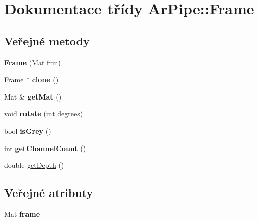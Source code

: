 \hypertarget{class_ar_pipe_1_1_frame}{\section{Dokumentace třídy Ar\-Pipe\-:\-:Frame}
\label{dd/d9d/class_ar_pipe_1_1_frame}
}
\subsection*{Veřejné metody}
\begin{DoxyCompactItemize}
\item 
\hypertarget{class_ar_pipe_1_1_frame_a7df86733519e85d78810c42e3af6d705}{{\bfseries Frame} (Mat frm)}\label{dd/d9d/class_ar_pipe_1_1_frame_a7df86733519e85d78810c42e3af6d705}

\item 
\hypertarget{class_ar_pipe_1_1_frame_afa0519f1ec506df02dfdce31bc5f60b0}{\hyperlink{class_ar_pipe_1_1_frame}{Frame} $\ast$ {\bfseries clone} ()}\label{dd/d9d/class_ar_pipe_1_1_frame_afa0519f1ec506df02dfdce31bc5f60b0}

\item 
\hypertarget{class_ar_pipe_1_1_frame_a288d704c6ca113753dc2f475ebba7060}{Mat \& {\bfseries get\-Mat} ()}\label{dd/d9d/class_ar_pipe_1_1_frame_a288d704c6ca113753dc2f475ebba7060}

\item 
\hypertarget{class_ar_pipe_1_1_frame_a280244b050dd0d620de5c32f7e061636}{void {\bfseries rotate} (int degrees)}\label{dd/d9d/class_ar_pipe_1_1_frame_a280244b050dd0d620de5c32f7e061636}

\item 
\hypertarget{class_ar_pipe_1_1_frame_a07610312b8cf3a3ed93f110bb79af65b}{bool {\bfseries is\-Grey} ()}\label{dd/d9d/class_ar_pipe_1_1_frame_a07610312b8cf3a3ed93f110bb79af65b}

\item 
\hypertarget{class_ar_pipe_1_1_frame_a027366e8e62fb46c7bf417588f7b5fe0}{int {\bfseries get\-Channel\-Count} ()}\label{dd/d9d/class_ar_pipe_1_1_frame_a027366e8e62fb46c7bf417588f7b5fe0}

\item 
double \hyperlink{class_ar_pipe_1_1_frame_a943c88c01272f29a6fde81deb045e63f}{get\-Depth} ()
\end{DoxyCompactItemize}
\subsection*{Veřejné atributy}
\begin{DoxyCompactItemize}
\item 
\hypertarget{class_ar_pipe_1_1_frame_afa105fc13822a413d8202c386376c2f2}{Mat {\bfseries frame}}\label{dd/d9d/class_ar_pipe_1_1_frame_afa105fc13822a413d8202c386376c2f2}

\end{DoxyCompactItemize}


